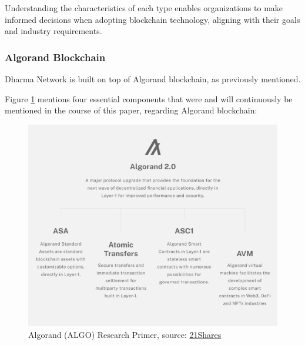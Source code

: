 Understanding the characteristics of each type enables organizations to make informed decisions when adopting blockchain technology, aligning with their goals and industry requirements.

\subsubsection{Algorand Blockchain}\label{algo_bc}

Dharma Network is built on top of Algorand blockchain, as previously mentioned. 

Figure \ref{fig:algoprimer} mentions four essential components that were and will continuously be mentioned in the course of this paper, regarding Algorand blockchain:

\begin{figure}[htbp]
	\centering
	\includegraphics[scale=0.2]{figures/Algorand_primer_content_10 (1).png}  %
	\caption{Algorand (ALGO) Research Primer, source: \href{https://21shares.com/research/algorand-research-primer}{21Shares}}
	\label{fig:algoprimer}
\end{figure}

